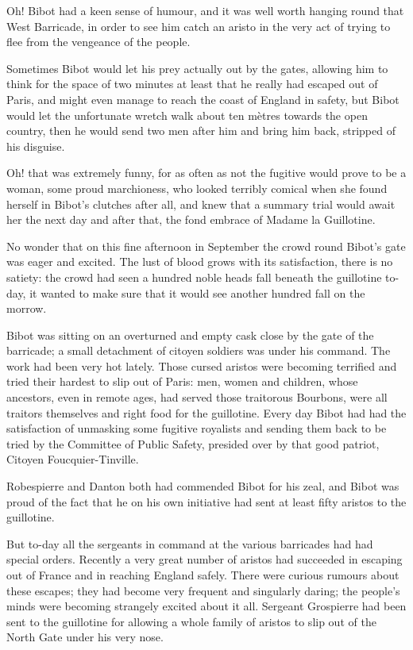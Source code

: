 \documentclass[paper=a5,BCOR=7mm,twoside,DIV=calc,12pt,usegeometry,chapterprefix,endperiod,headings=big]{scrbook}
\begin{document}
Oh! Bibot had a keen sense of humour, and it was well worth hanging round that West Barricade, in order to see him catch an aristo in the very act of trying to flee from the vengeance of the people.

Sometimes Bibot would let his prey actually out by the gates, allowing him to think for the space of two minutes at least that he really had escaped out of Paris, and might even manage to reach the coast of England in safety, but Bibot would let the unfortunate wretch walk about ten mètres towards the open country, then he would send two men after him and bring him back, stripped of his disguise.

Oh! that was extremely funny, for as often as not the fugitive would prove to be a woman, some proud marchioness, who looked terribly comical when she found herself in Bibot's clutches after all, and knew that a summary trial would await her the next day and after that, the fond embrace of Ma\-dame la Guillotine.

No wonder that on this fine afternoon in September the crowd round Bibot's gate was eager and excited. The lust of blood grows with its satisfaction, there is no satiety: the crowd had seen a hundred noble heads fall beneath the guillotine to-day, it wanted to make sure that it would see another hundred fall on the morrow.

Bibot was sitting on an overturned and empty cask close by the gate of the barricade; a small detachment of citoyen soldiers was under his command. The work had been very hot lately. Those cursed aristos were becoming terrified and tried their hardest to slip out of Paris: men, women and children, whose ancestors, even in remote ages, had served those traitorous Bourbons, were all traitors themselves and right food for the guillotine. Every day Bibot had had the satisfaction of unmasking some fugitive royalists and sending them back to be tried by the Committee of Public Safety, presided over by that good patriot, Citoyen Foucquier-Tinville.

Robespierre and Danton both had commended Bibot for his zeal, and Bibot was proud of the fact that he on his own initiative had sent at least fifty aristos to the guillotine.

But to-day all the sergeants in command at the various barricades had had special orders. Recently a very great number of aristos had succeeded in escaping out of France and in reaching England safely. There were curious rumours about these escapes; they had become very frequent and singularly daring; the people's minds were becoming strangely excited about it all. Sergeant Grospierre had been sent to the guillotine for allowing a whole family of aristos to slip out of the North Gate under his very nose.
\end{document}

